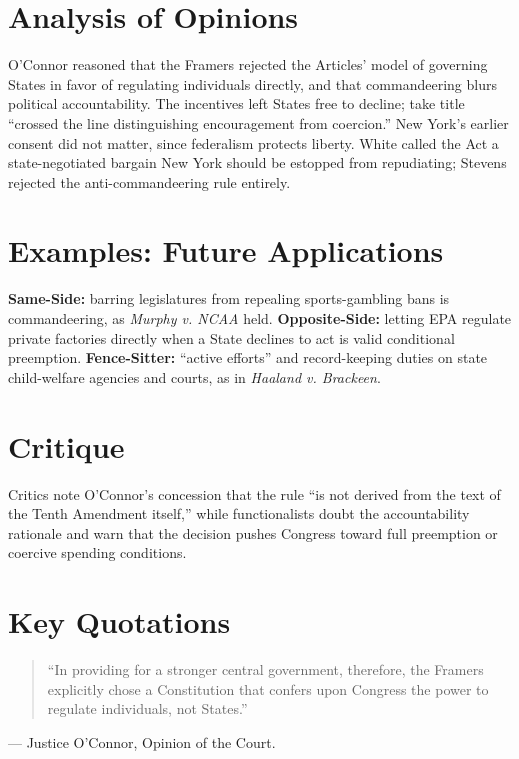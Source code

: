 \documentclass[12pt]{article}
\begin{document}
\section{Analysis of Opinions}
O'Connor reasoned that the Framers rejected the Articles' model of governing States in favor of regulating individuals directly, and that commandeering blurs political accountability. The incentives left States free to decline; take title ``crossed the line distinguishing encouragement from coercion.'' New York's earlier consent did not matter, since federalism protects liberty. White called the Act a state-negotiated bargain New York should be estopped from repudiating; Stevens rejected the anti-commandeering rule entirely.

\section{Examples: Future Applications}
\textbf{Same-Side:} barring legislatures from repealing sports-gambling bans is commandeering, as \textit{Murphy v. NCAA} held. \textbf{Opposite-Side:} letting EPA regulate private factories directly when a State declines to act is valid conditional preemption. \textbf{Fence-Sitter:} ``active efforts'' and record-keeping duties on state child-welfare agencies and courts, as in \textit{Haaland v. Brackeen}.

\section{Critique}
Critics note O'Connor's concession that the rule ``is not derived from the text of the Tenth Amendment itself,'' while functionalists doubt the accountability rationale and warn that the decision pushes Congress toward full preemption or coercive spending conditions.

\section{Key Quotations}
\begin{quote}
``In providing for a stronger central government, therefore, the Framers explicitly chose a Constitution that confers upon Congress the power to regulate individuals, not States.''
\end{quote}
\noindent --- Justice O'Connor, Opinion of the Court.
\end{document}
